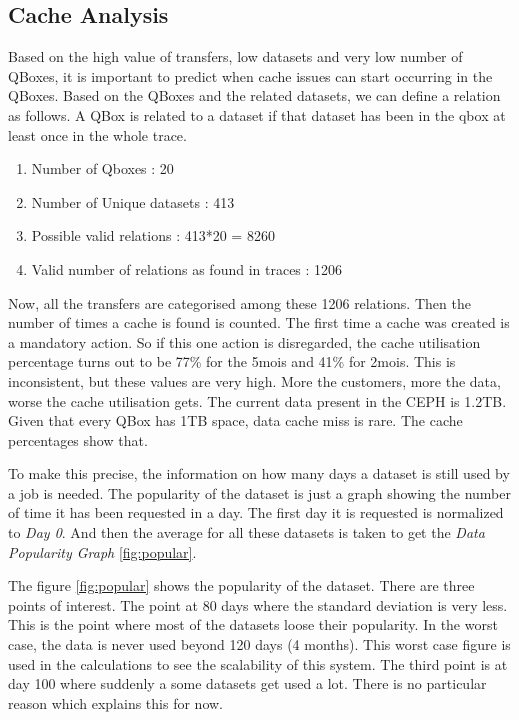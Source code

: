 \subsection{Cache Analysis}

Based on the high value of transfers, low datasets and very low number of QBoxes, it is important to predict when cache issues can start occurring in the QBoxes. Based on the QBoxes and the related datasets, we can define a relation as follows. A QBox is related to a dataset if that dataset has been in the qbox at least once in the whole trace.

\begin{enumerate}
    \item Number of Qboxes : 20
    \item Number of Unique datasets : 413
    \item Possible valid relations : 413*20 = 8260
    \item Valid number of relations as found in traces : 1206
\end{enumerate}

Now, all the transfers are categorised among these 1206 relations. Then the number of times a cache is found is counted. The first time a cache was created is a mandatory action. So if this one action is disregarded, the cache utilisation percentage turns out to be 77\% for the 5mois and 41\% for 2mois. This is inconsistent, but these values are very high. More the customers, more the data, worse the cache utilisation gets. The current data present in the CEPH is 1.2TB. Given that every QBox has 1TB space, data cache miss is rare. The cache percentages show that.

To make this precise, the information on how many days a dataset is still used by a job is needed. The popularity of the dataset is just a graph showing the number of time it has been requested in a day. The first day it is requested is normalized to \textit{Day 0}. And then the average for all these datasets is taken to get the \textit{Data Popularity Graph} \ref{fig:popular}.

The figure \ref{fig:popular} shows the popularity of the dataset. There are three points of interest. The point at 80 days where the standard deviation is very less. This is the point where most of the datasets loose their popularity. In the worst case, the data is never used beyond 120 days (4 months). This worst case figure is used in the calculations to see the scalability of this system. The third point is at day 100 where suddenly a some datasets get used a lot. There is no particular reason which explains this for now.

